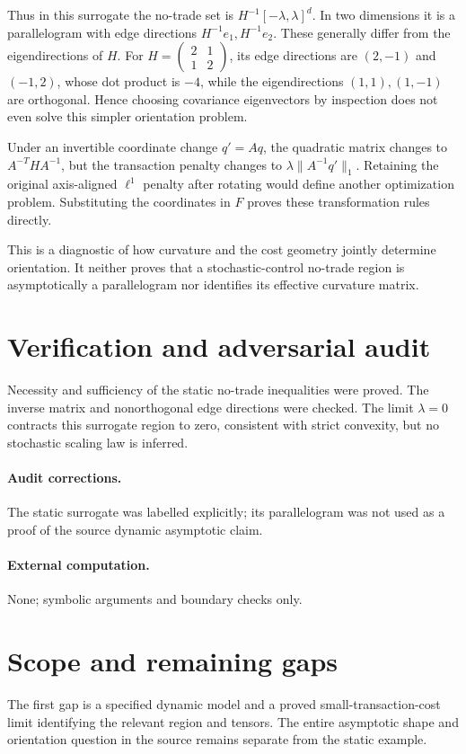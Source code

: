 \documentclass[11pt]{article}
\begin{document}
Thus in this surrogate the no-trade set is
$H^{-1}[-\lambda,\lambda]^d$. In two dimensions it is a parallelogram with
edge directions $H^{-1}e_1,H^{-1}e_2$. These generally differ from the
eigendirections of $H$. For
$H=\left(\begin{smallmatrix}2&1\\1&2\end{smallmatrix}\right)$, its edge
directions are $(2,-1)$ and $(-1,2)$, whose dot product is $-4$, while the
eigendirections $(1,1),(1,-1)$ are orthogonal. Hence choosing covariance
eigenvectors by inspection does not even solve this simpler orientation problem.

Under an invertible coordinate change $q'=Aq$, the quadratic matrix changes
to $A^{-T}HA^{-1}$, but the transaction penalty changes to
$\lambda\|A^{-1}q'\|_1$. Retaining the original axis-aligned $\ell^1$ penalty
after rotating would define another optimization problem. Substituting the
coordinates in $F$ proves these transformation rules directly.

This is a diagnostic of how curvature and the cost geometry jointly determine
orientation. It neither proves that a stochastic-control no-trade region is
asymptotically a parallelogram nor identifies its effective curvature matrix.
\section{Verification and adversarial audit}
Necessity and sufficiency of the static no-trade inequalities were proved.
The inverse matrix and nonorthogonal edge directions were checked. The limit
$\lambda=0$ contracts this surrogate region to zero, consistent with strict
convexity, but no stochastic scaling law is inferred.
\paragraph{Audit corrections.} The static surrogate was labelled explicitly; its parallelogram was not used as a proof of the source dynamic asymptotic claim.
\paragraph{External computation.} None; symbolic arguments and boundary checks only.
\section{Scope and remaining gaps}
The first gap is a specified dynamic model and a proved small-transaction-cost
limit identifying the relevant region and tensors. The entire asymptotic shape
and orientation question in the source remains separate from the static example.
\end{document}
